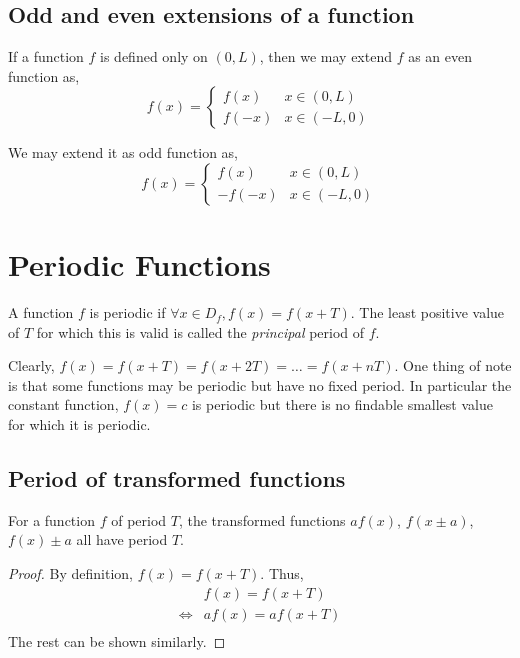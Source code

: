 \subsection{Odd and even extensions of a function}

If a function \(f\) is defined only on \(\left( 0, L \right)\), then we may extend \(f\) as an even function as,
\[
    f(x) =
    \begin{cases}
        f(x) & x \in \left( 0, L \right) \\
        f(-x) & x \in \left( -L, 0 \right)
    \end{cases}\]

We may extend it as odd function as,
\[
    f(x) =
    \begin{cases}
        f(x) & x \in \left( 0, L \right) \\
        -f(-x) & x \in \left( -L, 0 \right)
    \end{cases}\]   

\section{Periodic Functions}

A function \(f\) is periodic if \(\forall x \in D_{f}, f(x) = f(x + T)\). The least positive value of \(T\) for
which this is valid is called the \emph{principal} period of \(f\). 

Clearly, \(f(x) = f(x + T) = f(x + 2T) = \dots = f(x + nT)\). One thing of note is that some functions
may be periodic but have no fixed period. In particular the constant function, \(f(x) = c\) is periodic but
there is no findable smallest value for which it is periodic. 

\subsection{Period of transformed functions}
\begin{claim}
    For a function \(f\) of period \(T\), the transformed functions \(af(x)\), \(f(x \pm a)\), \(f(x) \pm a\)
    all have period \(T\). 
\end{claim}

\begin{proof}
    By definition, \(f(x) = f(x + T)\). Thus, 
    \begin{align*}
        & f(x) = f(x + T) \\
        \iff & af(x) = af(x + T) \\
    \end{align*}
    The rest can be shown similarly. 
\end{proof}

